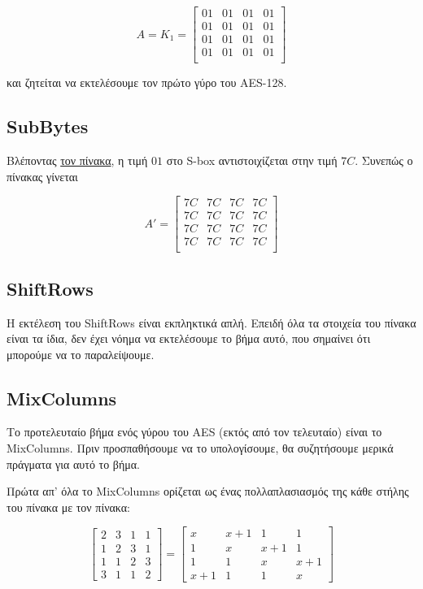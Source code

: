 \documentclass{article}
\begin{document}
$$
A = K_1 =
\begin{bmatrix}
01 & 01 & 01 & 01 \\
01 & 01 & 01 & 01 \\
01 & 01 & 01 & 01 \\
01 & 01 & 01 & 01 \\
\end{bmatrix}
$$

και ζητείται να εκτελέσουμε τον πρώτο γύρο του AES-128.

\subsection*{SubBytes}

Βλέποντας \href{https://en.wikipedia.org/wiki/Rijndael_S-box}{τον πίνακα}, η τιμή $01$ στο S-box αντιστοιχίζεται στην τιμή $7C$. Συνεπώς ο πίνακας γίνεται

$$
A' =
\begin{bmatrix}
7C & 7C & 7C & 7C \\
7C & 7C & 7C & 7C \\
7C & 7C & 7C & 7C \\
7C & 7C & 7C & 7C \\
\end{bmatrix}
$$

\subsection*{ShiftRows}

Η εκτέλεση του ShiftRows είναι εκπληκτικά απλή. Επειδή όλα τα στοιχεία του πίνακα είναι τα ίδια, δεν έχει νόημα να εκτελέσουμε το βήμα αυτό, που σημαίνει ότι μπορούμε να το παραλείψουμε.

\subsection*{MixColumns}

Το προτελευταίο βήμα ενός γύρου του AES (εκτός από τον τελευταίο) είναι το MixColumns. Πριν προσπαθήσουμε να το υπολογίσουμε, θα συζητήσουμε μερικά πράγματα για αυτό το βήμα.

Πρώτα απ' όλα το MixColumns ορίζεται ως ένας πολλαπλασιασμός της κάθε στήλης του πίνακα με τον πίνακα:

$$
\begin{bmatrix}
2 & 3 & 1 & 1 \\
1 & 2 & 3 & 1 \\
1 & 1 & 2 & 3 \\
3 & 1 & 1 & 2
\end{bmatrix} =
\begin{bmatrix}
x & x + 1 & 1 & 1 \\
1 & x & x + 1 & 1 \\
1 & 1 & x & x + 1 \\
x + 1 & 1 & 1 & x
\end{bmatrix}
$$
\end{document}
